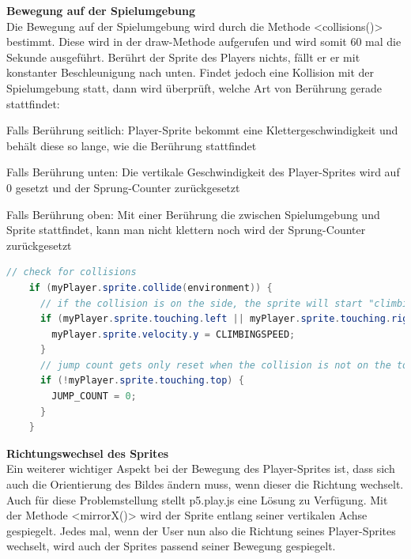 \textbf{Bewegung auf der Spielumgebung}
\\
Die Bewegung auf der Spielumgebung wird durch die Methode <collisions()> bestimmt. Diese wird in der draw-Methode aufgerufen und wird somit 60 mal die Sekunde ausgeführt.
Berührt der Sprite des Players nichts, fällt er er mit konstanter Beschleunigung nach unten.
Findet jedoch eine Kollision mit der Spielumgebung statt, dann wird überprüft, welche Art von Berührung gerade stattfindet:

\begin{compactitem}
    \item Falls Berührung seitlich: Player-Sprite bekommt eine Klettergeschwindigkeit und behält diese so lange, wie die Berührung stattfindet
    \item Falls Berührung unten: Die vertikale Geschwindigkeit des Player-Sprites wird auf 0 gesetzt und der Sprung-Counter zurückgesetzt
    \item Falls Berührung oben: Mit einer Berührung die zwischen Spielumgebung und Sprite stattfindet, kann man nicht klettern noch wird der Sprung-Counter zurückgesetzt
\end{compactitem}

\begin{lstlisting}[caption=Bewegung auf der Spielumgebung,language=Java,label=lst:impl:collisions]
    // check for collisions
    if (myPlayer.sprite.collide(environment)) {
      // if the collision is on the side, the sprite will start "climbing" with a certain speed
      if (myPlayer.sprite.touching.left || myPlayer.sprite.touching.right) {
        myPlayer.sprite.velocity.y = CLIMBINGSPEED;
      }
      // jump count gets only reset when the collision is not on the top of the player-sprite
      if (!myPlayer.sprite.touching.top) {
        JUMP_COUNT = 0;
      }
    }
\end{lstlisting}

\textbf{Richtungswechsel des Sprites}
\\
Ein weiterer wichtiger Aspekt bei der Bewegung des Player-Sprites ist, dass sich auch die Orientierung des Bildes ändern muss, wenn dieser die Richtung wechselt.
Auch für diese Problemstellung stellt p5.play.js eine Lösung zu Verfügung. Mit der Methode <mirrorX()> wird der Sprite entlang seiner vertikalen Achse gespiegelt.
Jedes mal, wenn der User nun also die Richtung seines Player-Sprites wechselt, wird auch der Sprites passend seiner Bewegung gespiegelt.

